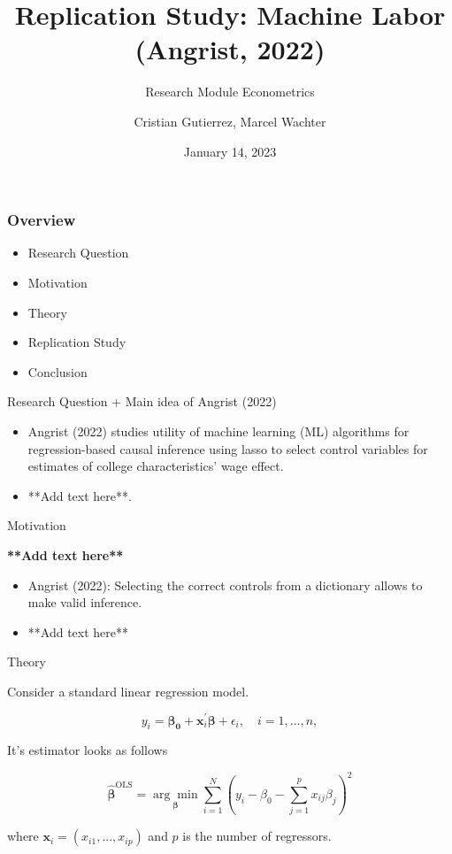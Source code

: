 \documentclass{beamer}
\title{Replication Study: Machine Labor (Angrist, 2022)}
\subtitle {Research Module Econometrics}
\author{Cristian Gutierrez, Marcel Wachter}
\date{January 14, 2023}
\begin{document}
\maketitle

\begin{frame}
\frametitle{Overview} 

\begin{itemize}
    

\item Research Question
\item Motivation
\item Theory
\item Replication Study
\item Conclusion
\end{itemize}
\end{frame}


\begin{frame} {Research Question + Main idea of Angrist (2022)}
\begin{itemize}

\item  Angrist (2022) studies utility of machine learning (ML) algorithms for regression-based causal inference using lasso to select control variables for estimates of college characteristics' wage effect.
\item **Add text here**.
\end{itemize}

\end{frame}






\begin{frame}{Motivation}

\flushleft \textbf{**Add text here**}
\vspace{4mm}
\begin{itemize}
    \item Angrist (2022): Selecting the correct controls from a dictionary allows to make valid inference.
    \item **Add text here**
\end{itemize}

\end{frame}


\begin{frame}{Theory}
\begin{flushleft}
\item Consider a standard linear regression model. 
\end{flushleft}
\[
    y_i=\boldsymbol{\beta_0} +\mathbf{x}_i^\prime \boldsymbol{\beta}+\epsilon_i, \quad i = 1, \ldots, n,
    \tag{1}
\]
\begin{flushleft}
It's estimator looks as follows
\end{flushleft}
\[
\hat{\boldsymbol{\beta}}^{\text{OLS}}=\underset{\boldsymbol{\beta}}{\arg \min}\sum_{i=1}^N (y_i-\beta_0-\sum_{j=1}^p x_{i j}\beta_j)^2
    \tag{2}
\]
\begin{flushleft}
where $\mathbf{x}_i=(x_{i1}, ..., x_{ip})$ and $p$ is the number of regressors.
\end{flushleft}
\end{frame}
\end{document}
